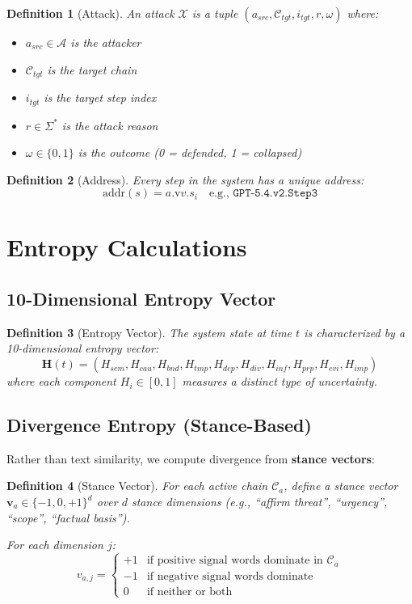 \documentclass[11pt,a4paper]{article}
\newtheorem{definition}{Definition}
\begin{document}
\begin{definition}[Attack]
An attack $\mathcal{X}$ is a tuple $(a_{src}, \mathcal{C}_{tgt}, i_{tgt}, r, \omega)$ where:
\begin{itemize}
    \item $a_{src} \in \mathcal{A}$ is the attacker
    \item $\mathcal{C}_{tgt}$ is the target chain
    \item $i_{tgt}$ is the target step index
    \item $r \in \Sigma^*$ is the attack reason
    \item $\omega \in \{0, 1\}$ is the outcome (0 = defended, 1 = collapsed)
\end{itemize}
\end{definition}

\begin{definition}[Address]
Every step in the system has a unique address:
$$\text{addr}(s) = a.\text{v}v.s_i \quad \text{e.g., } \texttt{GPT-5.4.v2.Step3}$$
\end{definition}

\section{Entropy Calculations}

\subsection{10-Dimensional Entropy Vector}

\begin{definition}[Entropy Vector]
The system state at time $t$ is characterized by a 10-dimensional entropy vector:
$$\mathbf{H}(t) = (H_{sem}, H_{cau}, H_{bnd}, H_{tmp}, H_{dep}, H_{div}, H_{inf}, H_{prp}, H_{evi}, H_{imp})$$
where each component $H_i \in [0, 1]$ measures a distinct type of uncertainty.
\end{definition}

\subsection{Divergence Entropy (Stance-Based)}

Rather than text similarity, we compute divergence from \textbf{stance vectors}:

\begin{definition}[Stance Vector]
For each active chain $\mathcal{C}_a$, define a stance vector $\mathbf{v}_a \in \{-1, 0, +1\}^d$ over $d$ stance dimensions (e.g., ``affirm threat'', ``urgency'', ``scope'', ``factual basis'').

For each dimension $j$:
$$v_{a,j} = \begin{cases}
+1 & \text{if positive signal words dominate in } \mathcal{C}_a \\
-1 & \text{if negative signal words dominate} \\
0 & \text{if neither or both}
\end{cases}$$
\end{definition}
\end{document}
